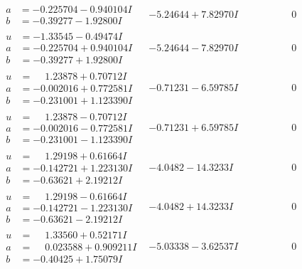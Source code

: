 \documentclass[1p]{elsarticle_modified}
\theoremstyle{definition}
\begin{document}
$$\begin{array}{c|c|c}
\begin{aligned}
a &= -0.225704 - 0.940104 I \\
b &= -0.39277 - 1.92800 I\end{aligned}
 & -5.24644 + 7.82970 I & \phantom{-0.000000 } 0 \\ \hline\begin{aligned}
u &= -1.33545 - 0.49474 I \\
a &= -0.225704 + 0.940104 I \\
b &= -0.39277 + 1.92800 I\end{aligned}
 & -5.24644 - 7.82970 I & \phantom{-0.000000 } 0 \\ \hline\begin{aligned}
u &= \phantom{-}1.23878 + 0.70712 I \\
a &= -0.002016 + 0.772581 I \\
b &= -0.231001 + 1.123390 I\end{aligned}
 & -0.71231 - 6.59785 I & \phantom{-0.000000 } 0 \\ \hline\begin{aligned}
u &= \phantom{-}1.23878 - 0.70712 I \\
a &= -0.002016 - 0.772581 I \\
b &= -0.231001 - 1.123390 I\end{aligned}
 & -0.71231 + 6.59785 I & \phantom{-0.000000 } 0 \\ \hline\begin{aligned}
u &= \phantom{-}1.29198 + 0.61664 I \\
a &= -0.142721 + 1.223130 I \\
b &= -0.63621 + 2.19212 I\end{aligned}
 & -4.0482 - 14.3233 I & \phantom{-0.000000 } 0 \\ \hline\begin{aligned}
u &= \phantom{-}1.29198 - 0.61664 I \\
a &= -0.142721 - 1.223130 I \\
b &= -0.63621 - 2.19212 I\end{aligned}
 & -4.0482 + 14.3233 I & \phantom{-0.000000 } 0 \\ \hline\begin{aligned}
u &= \phantom{-}1.33560 + 0.52171 I \\
a &= \phantom{-}0.023588 + 0.909211 I \\
b &= -0.40425 + 1.75079 I\end{aligned}
 & -5.03338 - 3.62537 I & \phantom{-0.000000 } 0 \\ \hline\begin{aligned}

\end{aligned}
\end{array}$$
\end{document}
